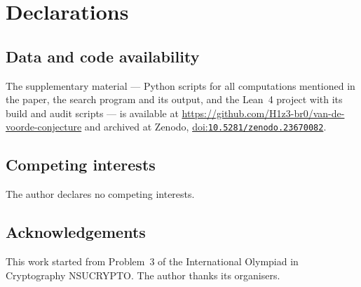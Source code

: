 \documentclass[11pt]{amsart}
\theoremstyle{definition}
\theoremstyle{remark}
\numberwithin{equation}{section}
\newcommand{\doi}[1]{\href{https://doi.org/#1}{doi:\nolinkurl{#1}}}
\begin{document}
\section*{Declarations}

\subsection*{Data and code availability}
The supplementary material --- Python scripts for all computations mentioned in the paper, the search program and its
output, and the Lean~4 project with its build and audit scripts --- is available at \url{https://github.com/H1z3-br0/van-de-voorde-conjecture} and archived at Zenodo,
\doi{10.5281/zenodo.23670082}.

\subsection*{Competing interests}
The author declares no competing interests.

\subsection*{Acknowledgements}
This work started from Problem~3 of the International Olympiad in Cryptography NSUCRYPTO. The author thanks its organisers.



\end{document}
